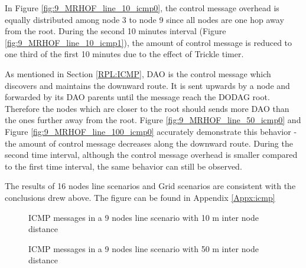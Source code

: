 In Figure \ref{fig:9_MRHOF_line_10_icmp0}, the control message overhead is equally distributed among node 3 to node 9 since all nodes are one hop away from the root. During the second 10 minutes interval (Figure \ref{fig:9_MRHOF_line_10_icmp1}), the amount of control message is reduced to one third of the first 10 minutes due to the effect of Trickle timer.
\newline

As mentioned in Section \ref{RPL:ICMP}, DAO is the control message which discovers and maintains the downward  route. It is sent upwards by a node and forwarded by its DAO parents until the message reach the DODAG root. Therefore the nodes which are closer to the root should sends more DAO than the ones further away from the root. Figure \ref{fig:9_MRHOF_line_50_icmp0} and Figure \ref{fig:9_MRHOF_line_100_icmp0} accurately demonstrate this behavior - the amount of control message decreases along the downward route. During the second time interval, although the control message overhead is smaller compared to the first time interval, the same behavior can still be observed. 
\newline 

The results of 16 nodes line scenarios and Grid scenarios are consistent with the conclusions drew above. The figure can be found in Appendix \ref{Appx:icmp}
  
\begin{figure}[htbp]
  \begin{center}
  	\hspace{-20pt}
    \leavevmode
       \hspace{-30pt}
    \caption{ICMP messages in a 9 nodes line scenario with 10 m inter node distance}
    \label{fig:9_MRHOF_line_10_icmp}
  \end{center}
\end{figure}

\begin{figure}[htbp]
  \begin{center}
   \hspace{-20pt}
    \leavevmode
       \hspace{-30pt}
    \caption{ICMP messages in a 9 nodes line scenario with 50 m inter node distance}
    \label{fig:9_MRHOF_line_50_icmp}
  \end{center}
\end{figure}

